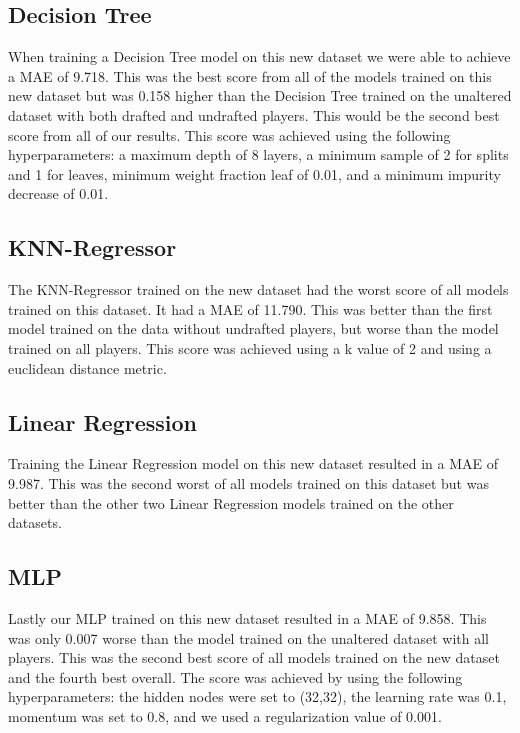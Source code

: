 \documentclass{article}
\begin{document}
\subsection{Decision Tree}

When training a Decision Tree model on this new dataset we were able to achieve a MAE of 9.718.
This was the best score from all of the models trained on this new dataset but was 0.158 higher than 
the Decision Tree trained on the unaltered dataset with both drafted and undrafted players. 
This would be the second best score from all of our results. This score was achieved using the following 
hyperparameters: a maximum depth of 8 layers, a minimum sample of 2 for splits and 1 for leaves, 
minimum weight fraction leaf of 0.01, and a minimum impurity decrease of 0.01.

\subsection{KNN-Regressor}

The KNN-Regressor trained on the new dataset had the worst score of all models trained on this dataset.
It had a MAE of 11.790. This was better than the first model trained on the data without undrafted players, 
but worse than the model trained on all players. This score was achieved using a k value of 2 and using a 
euclidean distance metric.

\subsection{Linear Regression}

Training the Linear Regression model on this new dataset resulted in a MAE of 9.987. This was 
the second worst of all models trained on this dataset but was better than the other two Linear 
Regression models trained on the other datasets.

\subsection{MLP}

Lastly our MLP trained on this new dataset resulted in a MAE of 9.858. This was only 0.007 worse 
than the model trained on the unaltered dataset with all players. This was the second best score of 
all models trained on the new dataset and the fourth best overall. The score was achieved by using 
the following hyperparameters: the hidden nodes were set to (32,32), the learning rate was 0.1, 
momentum was set to 0.8, and we used a regularization value of 0.001.
\end{document}
